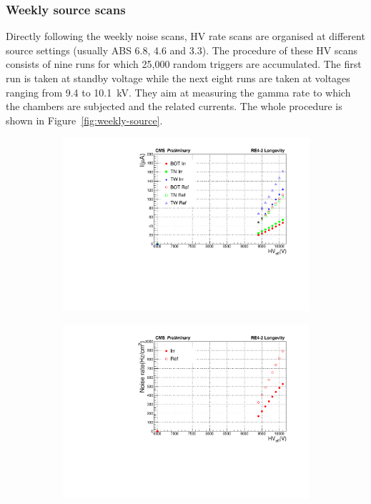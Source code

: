 		\subsubsection{Weekly source scans}
		\label{chapt5:sssec:sourcescan}
		
	Directly following the weekly noise scans, HV rate scans are organised at different source settings (usually ABS 6.8, 4.6 and 3.3). The procedure of these HV scans consists of nine runs for which 25,000 random triggers are accumulated. The first run is taken at standby voltage while the next eight runs are taken at voltages ranging from 9.4 to \SI{10.1}{kV}. They aim at measuring the gamma rate to which the chambers are subjected and the related currents. The whole procedure is shown in Figure~\ref{fig:weekly-source}.
	
	\begin{figure}[H]
    	\begin{subfigure}{0.5\linewidth}
			\centering
    		\includegraphics[width = \linewidth]{fig/chapt5/Weekly-source-Scan-Currents.pdf}
        	\caption{\label{fig:weekly-source:A}}
    	\end{subfigure}
    	\begin{subfigure}{0.5\linewidth}
			\centering
    		\includegraphics[width = \linewidth]{fig/chapt5/Weekly-source-Scan-Rates.pdf}

\end{subfigure}
\end{figure}
